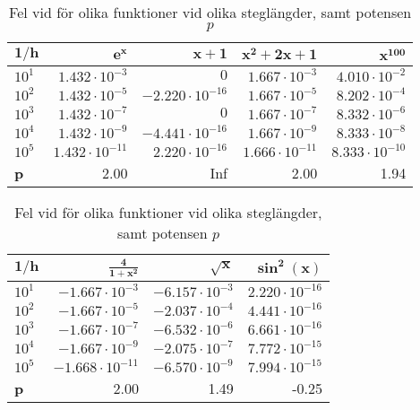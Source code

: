 \documentclass[a4paper,titlepage]{article}
\begin{document}
\begin{table}[h]
    \centering
    \begin{tabular}{l | r | r | r | r }
        $\mathbf{1/h}$ & $\mathbf{e^x}$         & $\mathbf{x + 1}$         & $\mathbf{x^2 + 2x + 1}$ & $\mathbf{x^{100}}$     \\ \hline
        $10^1$         & $1.432 \cdot 10^{-3}$  & $0                    $  & $1.667 \cdot 10^{-3}  $ & $4.010 \cdot 10^{-2} $ \\
        $10^2$         & $1.432 \cdot 10^{-5}$  & $-2.220 \cdot 10^{-16}$  & $1.667 \cdot 10^{-5}  $ & $8.202 \cdot 10^{-4} $ \\
        $10^3$         & $1.432 \cdot 10^{-7}$  & $0                    $  & $1.667 \cdot 10^{-7}  $ & $8.332 \cdot 10^{-6} $ \\
        $10^4$         & $1.432 \cdot 10^{-9}$  & $-4.441 \cdot 10^{-16}$  & $1.667 \cdot 10^{-9}  $ & $8.333 \cdot 10^{-8} $ \\
        $10^5$         & $1.432 \cdot 10^{-11}$ & $2.220 \cdot 10^{-16}$   & $1.666 \cdot 10^{-11} $ & $8.333 \cdot 10^{-10}$ \\ \hline
        \textbf{p}     & 2.00                   & Inf                      & 2.00                    & 1.94                   \\
    \end{tabular}
    \begin{tabular}{l | r | r | r }
        $\mathbf{1/h}$  & $\mathbf{\frac{4}{1 + x^2}}$ & $\mathbf{\sqrt x}$           & $\mathbf{\sin^2(x)}$ \\ \hline
        $10^1$          & $-1.667 \cdot 10^{-3}$       & $-6.157 \cdot 10^{-3}$       & $2.220 \cdot 10^{-16}$ \\
        $10^2$          & $-1.667 \cdot 10^{-5}$       & $-2.037 \cdot 10^{-4}$       & $4.441 \cdot 10^{-16}$ \\
        $10^3$          & $-1.667 \cdot 10^{-7}$       & $-6.532 \cdot 10^{-6}$       & $6.661 \cdot 10^{-16}$ \\
        $10^4$          & $-1.667 \cdot 10^{-9}$       & $-2.075 \cdot 10^{-7}$       & $7.772 \cdot 10^{-15}$ \\
        $10^5$          & $-1.668 \cdot 10^{-11}$      & $-6.570 \cdot 10^{-9}$       & $7.994 \cdot 10^{-15}$ \\ \hline
        \textbf{p}      & 2.00                         & 1.49                         & -0.25 \\
    \end{tabular}
    \caption{Fel vid för olika funktioner vid olika steglängder, samt potensen $p$}
    \label{tab:errors}
\end{table}
\end{document}
